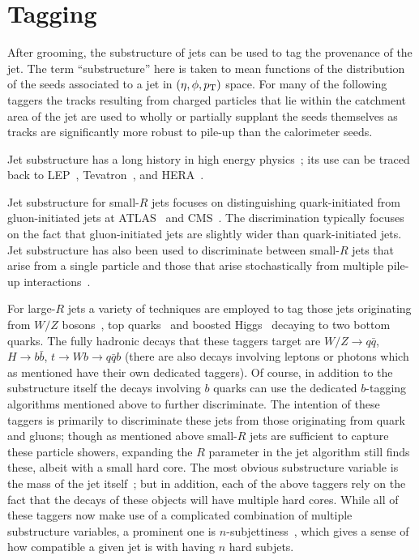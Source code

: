 \section{Tagging}
\label{sec:jets:tagging}
After grooming, the substructure of jets can be used to tag the provenance of the jet.
The term ``substructure'' here is taken to mean functions of the distribution of the seeds associated to a jet in $(\eta,\phi,p_{\text{T}})$ space.
For many of the following taggers the tracks resulting from charged particles that lie within the catchment area of the jet are used to wholly or partially supplant the seeds themselves as tracks are significantly more robust to pile-up than the calorimeter seeds.

Jet substructure has a long history in high energy physics~\cite{Larkoski:2017jix,Asquith:2018igt};
its use can be traced back to LEP~\cite{Alexander:1991ce,Barate:1998cp,Abreu:1995hp,Acciarri:1997it}, Tevatron~\cite{Abe:1992wv,Abachi:1995zw}, and HERA~\cite{Breitweg:1997gg,Breitweg:1998gf,Adloff:1998ni}.

Jet substructure for small-$R$ jets focuses on distinguishing quark-initiated from gluon-initiated jets at ATLAS~\cite{ATL-PHYS-PUB-2017-009,Aad:2014gea,ATLAS-CONF-2016-034,ATL-PHYS-PUB-2017-017} and CMS~\cite{CMS-PAS-JME-16-003,CMS-PAS-JME-13-002,CMS-DP-2016-070,CMS-DP-2017-027}.
The discrimination typically focuses on the fact that gluon-initiated jets are slightly wider than quark-initiated jets.
Jet substructure has also been used to discriminate between small-$R$ jets that arise from a single particle and those that arise stochastically from multiple pile-up interactions~\cite{Aaboud:2017pou}.

For large-$R$ jets a variety of techniques are employed to tag those jets originating from $W/Z$ bosons~\cite{ATL-PHYS-PUB-2014-004,Aad:2015rpa,Aaboud:2018psm}, top quarks~\cite{Aad:2016pux,Aaboud:2018psm} and boosted Higgs~\cite{Aad:2019uoz} decaying to two bottom quarks.
The fully hadronic decays that these taggers target are $W/Z\rightarrow q\bar{q}$, $H\rightarrow b\bar{b}$, $t\rightarrow Wb \rightarrow q\bar{q} b$ (there are also decays involving leptons or photons which as mentioned have their own dedicated taggers).
Of course, in addition to the substructure itself the decays involving $b$ quarks can use the dedicated $b$-tagging algorithms mentioned above to further discriminate.
The intention of these taggers is primarily to discriminate these jets from those originating from quark and gluons; though as mentioned above small-$R$ jets are sufficient to capture these particle showers, expanding the $R$ parameter in the jet algorithm still finds these, albeit with a small hard core.
The most obvious substructure variable is the mass of the jet itself~\cite{ATLAS-CONF-2016-035}; but in addition, each of the above taggers rely on the fact that the decays of these objects will have multiple hard cores.
While all of these taggers now make use of a complicated combination of multiple substructure variables, a prominent one is $n$-subjettiness~\cite{Thaler:2010tr}, which gives a sense of how compatible a given jet is with having $n$ hard subjets.

